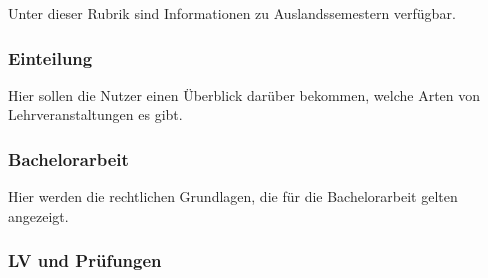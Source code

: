 \documentclass[a4paper,10pt]{scrartcl}
\begin{document}
Unter dieser Rubrik sind Informationen zu Auslandssemestern verfügbar.

\subsubsection{Einteilung}

\noindent{}
\medskip

Hier sollen die Nutzer einen Überblick darüber bekommen, welche Arten von Lehrveranstaltungen es gibt.

\subsubsection{Bachelorarbeit}

\noindent{}
\medskip

Hier werden die rechtlichen Grundlagen, die für die Bachelorarbeit gelten angezeigt.

\subsubsection{LV und Prüfungen}
\end{document}
